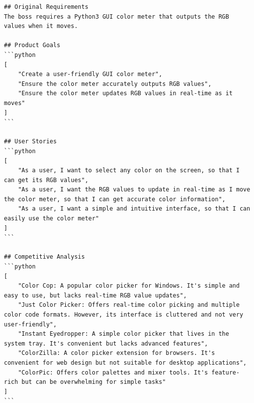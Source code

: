 

\begin{tcolorbox}[title={\textbf{\small Product Requirement Document}}, colback=whitesmoke, colframe=royalblue(web), boxrule=2pt, arc=0mm]
{\scriptsize
\begin{lstlisting}[style=mystyle]
## Original Requirements
The boss requires a Python3 GUI color meter that outputs the RGB values when it moves.

## Product Goals
```python
[
    "Create a user-friendly GUI color meter",
    "Ensure the color meter accurately outputs RGB values",
    "Ensure the color meter updates RGB values in real-time as it moves"
]
```

## User Stories
```python
[
    "As a user, I want to select any color on the screen, so that I can get its RGB values",
    "As a user, I want the RGB values to update in real-time as I move the color meter, so that I can get accurate color information",
    "As a user, I want a simple and intuitive interface, so that I can easily use the color meter"
]
```

## Competitive Analysis
```python
[
    "Color Cop: A popular color picker for Windows. It's simple and easy to use, but lacks real-time RGB value updates",
    "Just Color Picker: Offers real-time color picking and multiple color code formats. However, its interface is cluttered and not very user-friendly",
    "Instant Eyedropper: A simple color picker that lives in the system tray. It's convenient but lacks advanced features",
    "ColorZilla: A color picker extension for browsers. It's convenient for web design but not suitable for desktop applications",
    "ColorPic: Offers color palettes and mixer tools. It's feature-rich but can be overwhelming for simple tasks"
]
```

\end{lstlisting}
}
\end{tcolorbox}

